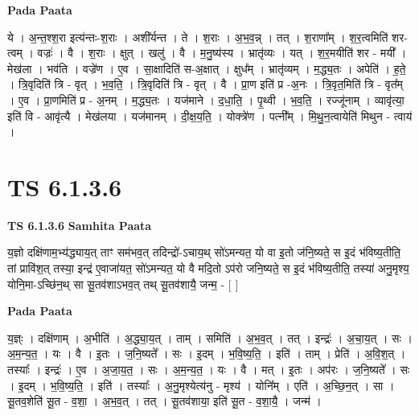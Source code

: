 \documentclass[17pt]{extarticle}
\begin{document}
\textbf{Pada Paata} \newline

ये । अ॒न्त॒श्श॒रा इत्य॑न्तः-श॒राः । अशी᳚र्यन्त । ते । श॒राः । अ॒भ॒व॒न्न् । तत् । श॒राणा᳚म् । श॒र॒त्वमिति॑ शर-त्वम् । वज्रः॑ । वै । श॒राः । क्षुत् । खलु॑ । वै । म॒नु॒ष्य॑स्य । भ्रातृ॑व्यः । यत् । श॒र॒मयीति॑ शर - मयी᳚ । मेख॑ला । भव॑ति । वज्रे॑ण । ए॒व । सा॒क्षादिति॑ स-अ॒क्षात् । क्षुध᳚म् । भ्रातृ॑व्यम् । म॒द्ध्य॒तः । अपेति॑ । ह॒ते॒ । त्रि॒वृदिति॑ त्रि - वृत् । भ॒व॒ति॒ । त्रि॒वृदिति॑ त्रि - वृत् । वै । प्रा॒ण इति॑ प्र -अ॒नः । त्रि॒वृत॒मिति॑ त्रि - वृत᳚म् । ए॒व । प्रा॒णमिति॑ प्र - अ॒नम् । म॒द्ध्य॒तः । यज॑माने । द॒धा॒ति॒ । पृ॒थ्वी । भ॒व॒ति॒ । रज्जू॑नाम् । व्यावृ॑त्या॒ इति॑ वि - आवृ॑त्यै । मेख॑लया । यज॑मानम् । दी॒क्ष॒य॒ति॒ । योक्त्रे॑ण । पत्नी᳚म् । मि॒थु॒न॒त्वायेति॑ मिथुन - त्वाय॑ ।  \newline





\section{ TS 6.1.3.6 }

\textbf{TS 6.1.3.6 } \newline
\textbf{Samhita Paata} \newline

य॒ज्ञो दक्षि॑णाम॒भ्य॑द्ध्याय॒त् ताꣳ सम॑भव॒त् तदिन्द्रो॑-ऽचाय॒थ् सो॑ऽमन्यत॒ यो वा इ॒तो ज॑नि॒ष्यते॒ स इ॒दं भ॑विष्य॒तीति॒ तां प्रावि॑श॒त् तस्या॒ इन्द्र॑ ए॒वाजा॑यत॒ सो॑ऽमन्यत॒ यो वै मदि॒तो ऽप॑रो जनि॒ष्यते॒ स इ॒दं भ॑विष्य॒तीति॒ तस्या॑ अनु॒मृश्य॒ योनि॒मा-ऽच्छि॑न॒थ् सा सू॒तव॑शाऽभव॒त् तथ् सू॒तव॑शायै॒ जन्म॒ - [  ] \newline

\textbf{Pada Paata} \newline

य॒ज्ञ्ः । दक्षि॑णाम् । अ॒भीति॑ । अ॒द्ध्या॒य॒त् । ताम् । समिति॑ । अ॒भ॒व॒त् । तत् । इन्द्रः॑ । अ॒चा॒य॒त् । सः । अ॒म॒न्य॒त॒ । यः । वै । इ॒तः । ज॒नि॒ष्यते᳚ । सः । इ॒दम् । भ॒वि॒ष्य॒ति॒ । इति॑ । ताम् । प्रेति॑ । अ॒वि॒श॒त् । तस्याः᳚ । इन्द्रः॑ । ए॒व । अ॒जा॒य॒त॒ । सः । अ॒म॒न्य॒त॒ । यः । वै । मत् । इ॒तः । अप॑रः । ज॒नि॒ष्यते᳚ । सः । इ॒दम् । भ॒वि॒ष्य॒ति॒ । इति॑ । तस्याः᳚ । अ॒नु॒मृश्येत्य॑नु - मृश्य॑ । योनि᳚म् । एति॑ । अ॒च्छि॒न॒त् । सा । सू॒तव॒शेति॑ सू॒त - व॒शा॒ । अ॒भ॒व॒त् । तत् । सू॒तव॑शाया॒ इति॑ सू॒त - व॒शा॒यै॒ । जन्म॑ ।  \newline




\end{document}
